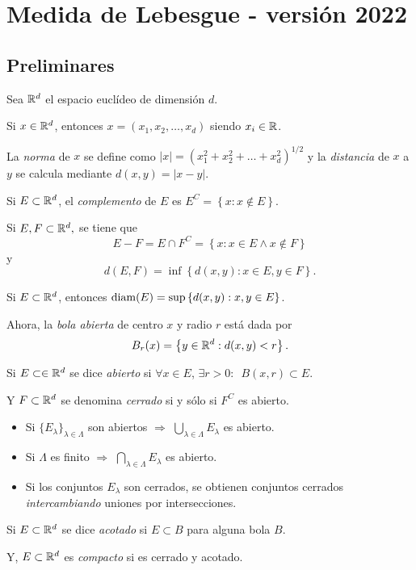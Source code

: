 \chapter{Medida de Lebesgue -  versi\'on 2022}

\section{Preliminares}
Sea $\mathbb{R}^d$ el espacio eucl\'ideo de dimensi\'on $d$. 

Si $x \in \mathbb{R}^d$, entonces $x=(x_1,x_2,\ldots,x_d)$ siendo $x_i\in \mathbb{R}$.

La \emph{norma} de $x$ se define como $|x|=\left(x_1^2+x_2^2+\ldots+x_d^2\right)^{1/2}$ y la \emph{distancia} de $x$ a $y$
se calcula mediante $d(x,y)=|x-y|$.

Si $E\subset \mathbb{R}^d$, el \emph{complemento} de $E$ es 
$E^C=\left\{ x:x\notin E\right\}$.

Si $E,F\subset \mathbb{R}^d,$ se tiene que 
$$E-F=E\cap F^C=\left\{x: x\in E \wedge x \notin F\right\}$$ y 
$$d(E,F)=\inf \left\{d(x,y):x\in E, y \in F \right\}.$$

Si $E \subset \mathbb{R}^d$, entonces $\operatorname{diam}(E)=\sup\left\{ d(x,y): x,y \in E \right\}$.

Ahora, la \emph{bola abierta} de centro $x$ y radio $r$ est\'a dada por \[B_r(x)=\left\{y \in \mathbb{R}^d: d(x,y)<r  \right\}.\]

Si $E \subset \in \mathbb{R}^d$ se dice \emph{abierto} si $\forall x \in E$, $\exists r>0:$\, $B(x,r)\subset E$. 

Y $F \subset \mathbb{R}^d$ se denomina \emph{cerrado} si y s\'olo si $F^C$ es abierto.

\begin{itemize}
    \item Si $\{E_{\lambda}\}_{\lambda \in \Lambda}$ son abiertos $\Rightarrow$ $ \bigcup\limits_{\lambda \in \Lambda} E_{\lambda}$ 
    es abierto. 
    \item Si $\Lambda$ es finito $\Rightarrow$ $ \bigcap\limits_{\lambda \in \Lambda} E_{\lambda}$ es abierto.
    \item Si los conjuntos $E_{\lambda}$ son cerrados, se obtienen conjuntos cerrados \emph{intercambiando} uniones por intersecciones.
\end{itemize}

Si $E \subset \mathbb{R}^d$ se dice \emph{acotado} si $E\subset B$ para alguna bola $B$.

Y, $E \subset \mathbb{R}^d $ es \emph{compacto} si es cerrado y acotado.


